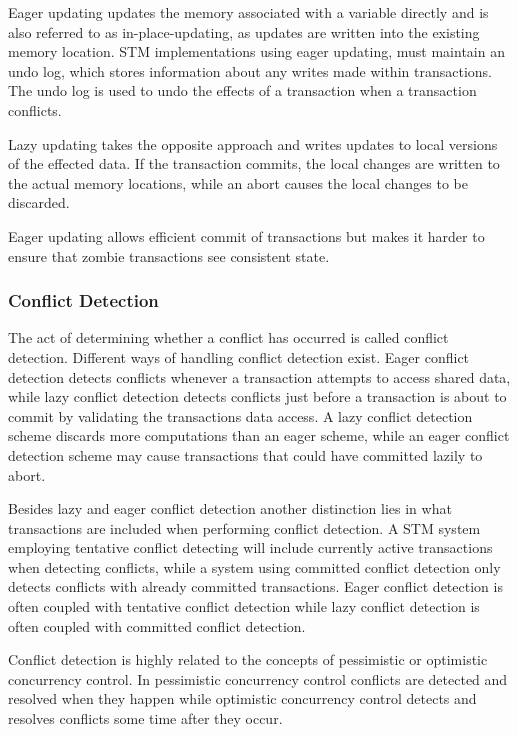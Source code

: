 Eager updating updates the memory associated with a variable directly and is also referred to as in-place-updating, as updates are written into the existing memory location\cite[p. 35]{afek2011lowering}. \ac{STM} implementations using eager updating, must maintain an undo log, which stores information about any writes made within transactions. The undo log is used to undo the effects of a transaction when a transaction conflicts\cite[p. 2084]{herlihy2011tm}.

Lazy updating takes the opposite approach and writes updates to local versions of the effected data\cite[p. 2084]{herlihy2011tm}. If the transaction commits, the local changes are written to the actual memory locations, while an abort causes the local changes to be discarded.

Eager updating allows efficient commit of transactions but makes it harder to ensure that zombie transactions see consistent state\cite[p. 2084]{herlihy2011tm}.

\subsubsection{Conflict Detection}
\label{sec:stm_conflict_detection}
The act of determining whether a conflict has occurred is called conflict detection\cite[p. 20]{harris2010transactional}. Different ways of handling conflict detection exist. Eager conflict detection detects conflicts whenever a transaction attempts to access shared data, while lazy conflict detection detects conflicts just before a transaction is about to commit by validating the transactions data access\cite[p. 21]{harris2010transactional}. A lazy conflict detection scheme discards more computations than an eager scheme, while an eager conflict detection scheme may cause transactions that could have committed lazily to abort\cite[p. 21]{harris2010transactional}.

Besides lazy and eager conflict detection another distinction lies in what transactions are included when performing conflict detection. A \ac{STM} system employing tentative conflict detecting will include currently active transactions when detecting conflicts, while a system using committed conflict detection only detects conflicts with already committed transactions. Eager conflict detection is often coupled with tentative conflict detection while lazy conflict detection is often coupled with committed conflict detection\cite[p. 22]{harris2010transactional}.

Conflict detection is highly related to the concepts of pessimistic or optimistic concurrency control. In pessimistic concurrency control conflicts are detected and resolved when they happen\cite[p. 20]{harris2010transactional} while optimistic concurrency control detects and resolves conflicts some time after they occur\cite[p. 20]{harris2010transactional}.


